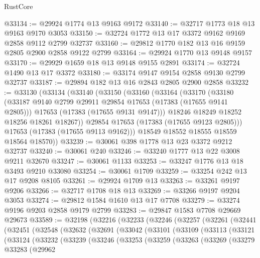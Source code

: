 \begin{lexlean}{RustCore}
\begin{coremodule}
@33134 := @29924 @1774 @13 @9163 @9172
@33140 := @32717 @1773 @18 @13 @9163 @9170 @3053
@33150 := @32724 @1772 @13 @17 @3372 @9162 @9169 @2858 @9112 @2799 @32737
@33160 := @29812 @1770 @182 @13 @16 @9159 @2805 @2900 @2858 @9122 @2799
@33164 := @29924 @1770 @13 @9148 @9157
@33170 := @29929 @1659 @18 @13 @9148 @9155 @2891
@33174 := @32724 @1490 @13 @17 @3372
@33180 := @33174 @9147 @9154 @2858 @9130 @2799 @32737
@33187 := @29894 @182 @13 @16 @2843 @2805 @2900 @2858
@33232 := @33130
    (@33134
      (@33140
        (@33150
          (@33160
            (@33164
              (@33170
                (@33180
                  (@33187 @9140 @2799 @29911 @29854 @17653 (@17383 (@17655 @9141 @2805)))
                  @17653
                  (@17383 (@17655 @9131 @9147)))
                @18246
                @18249
                @18252
                @18256
                @18261
                @18267))
            @29854
            @17653
            (@17383 (@17655 @9123 @2805)))
          @17653
          (@17383 (@17655 @9113 @9162)))
        @18549
        @18552
        @18555
        @18559
        @18564
        @18570))
@33239 := @30061 @398 @1778 @13 @23 @3372 @9212 @32737
@33240 := @30061 @240
@33246 := @33240 @1777 @13 @22 @3008 @9211 @32670
@33247 := @30061 @1133
@33253 := @33247 @1776 @13 @18 @3493 @9210 @33080
@33254 := @30061 @1709
@33259 := @33254 @242 @13 @17 @9208 @8105
@33261 := @29924 @1709 @13
@33263 := @33261 @9197 @9206
@33266 := @32717 @1708 @18 @13
@33269 := @33266 @9197 @9204 @3053
@33274 := @29812 @1584 @1610 @13 @17 @7708
@33279 := @33274 @9196 @9203 @2858 @9179 @2799
@33283 := @29847 @1583 @7708 @29669 @29673
@33589 := @32198
    (@32216
      (@32233
        (@32246
          (@32257
            (@32261
              (@32441
                (@32451
                  (@32548
                    (@32632
                      (@32691
                        (@33042
                          (@33101
                            (@33109
                              (@33113
                                (@33121
                                  (@33124
                                    (@33232
                                      (@33239
                                        (@33246
                                          (@33253
                                            (@33259
                                              (@33263
                                                (@33269
                                                  (@33279
                                                    @33283
                                                    (@29962

\end{coremodule}
\end{lexlean}

